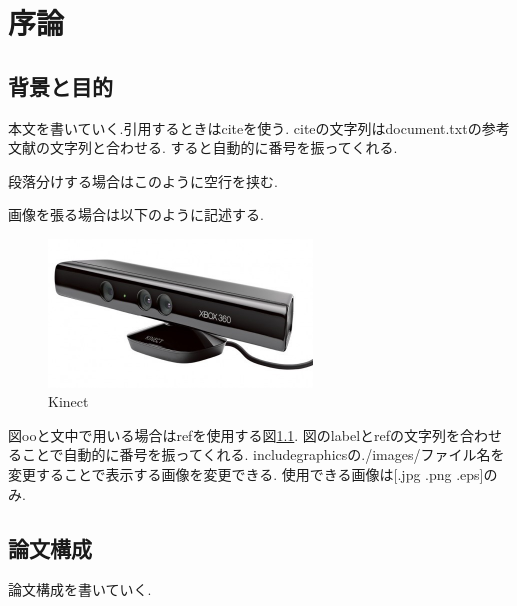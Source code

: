 \chapter{序論}\label{abst}
\section{背景と目的}
本文を書いていく.引用するときはciteを使う\cite{cite_1}.
citeの文字列はdocument.txtの参考文献の文字列と合わせる.
すると自動的に番号を振ってくれる.

段落分けする場合はこのように空行を挟む.

画像を張る場合は以下のように記述する.

\begin{figure}[htbp]
  \begin{center}
    \includegraphics[clip,width=7.0cm]{./images/Kinect.jpg}
    \caption{Kinect}
    \label{fig:Kinect}
  \end{center}
\end{figure}

図ooと文中で用いる場合はrefを使用する図\ref{fig:Kinect}.
図のlabelとrefの文字列を合わせることで自動的に番号を振ってくれる.
includegraphicsの./images/ファイル名を変更することで表示する画像を変更できる.
使用できる画像は[.jpg .png .eps]のみ.

\section{論文構成}
論文構成を書いていく.
